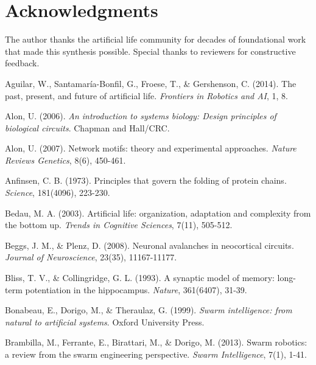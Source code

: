 \documentclass[11pt]{article}
\begin{document}
\section*{Acknowledgments}

The author thanks the artificial life community for decades of foundational work that made this synthesis possible. Special thanks to reviewers for constructive feedback.


\begin{thebibliography}{99}

Aguilar, W., Santamaría-Bonfil, G., Froese, T., \& Gershenson, C. (2014).
\newblock The past, present, and future of artificial life.
\newblock \textit{Frontiers in Robotics and AI}, 1, 8.

Alon, U. (2006).
\newblock \textit{An introduction to systems biology: Design principles of biological circuits}.
\newblock Chapman and Hall/CRC.

Alon, U. (2007).
\newblock Network motifs: theory and experimental approaches.
\newblock \textit{Nature Reviews Genetics}, 8(6), 450-461.

Anfinsen, C. B. (1973).
\newblock Principles that govern the folding of protein chains.
\newblock \textit{Science}, 181(4096), 223-230.

Bedau, M. A. (2003).
\newblock Artificial life: organization, adaptation and complexity from the bottom up.
\newblock \textit{Trends in Cognitive Sciences}, 7(11), 505-512.

Beggs, J. M., \& Plenz, D. (2008).
\newblock Neuronal avalanches in neocortical circuits.
\newblock \textit{Journal of Neuroscience}, 23(35), 11167-11177.

Bliss, T. V., \& Collingridge, G. L. (1993).
\newblock A synaptic model of memory: long-term potentiation in the hippocampus.
\newblock \textit{Nature}, 361(6407), 31-39.

Bonabeau, E., Dorigo, M., \& Theraulaz, G. (1999).
\newblock \textit{Swarm intelligence: from natural to artificial systems}.
\newblock Oxford University Press.

Brambilla, M., Ferrante, E., Birattari, M., \& Dorigo, M. (2013).
\newblock Swarm robotics: a review from the swarm engineering perspective.
\newblock \textit{Swarm Intelligence}, 7(1), 1-41.


\end{thebibliography}
\end{document}
